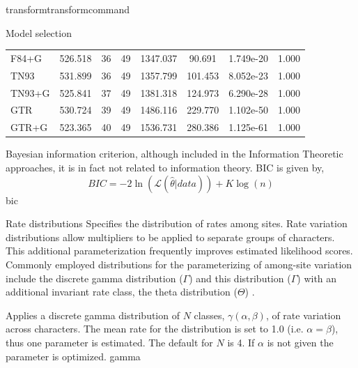 \begin{command}{transform}{transformcommand}
\begin{arguments}
\begin {argumentgroup}{Model selection}
\begin{table}[t]
\begin{center}
\begin{tabular}{ l c r r  r  c c  r }
                    F84+G &526.518&36&49&1347.037& 90.691&1.749e-20&1.000 \\
                    TN93  &531.899&36&49&1357.799&101.453&8.052e-23&1.000 \\
                    TN93+G&525.841&37&49&1381.318&124.973&6.290e-28&1.000 \\
                    GTR   &530.724&39&49&1486.116&229.770&1.102e-50&1.000 \\
                    GTR+G &523.365&40&49&1536.731&280.386&1.125e-61&1.000 \\
                       \hline
                    \end{tabular}
                \end{center}
\end{table}

                        { Bayesian information criterion, although included in
                        the Information Theoretic approaches, it is in fact not
                        related to information theory. BIC is given by,
                        \begin{equation*}
                            BIC = - 2 \ln(\mathcal{L}(\hat{\theta}|data)) + K \log(n)
                        \end{equation*}}
                        {bic}
                \end{argumentgroup}


\begin{argumentgroup}{Rate distributions}
                Specifies the distribution of rates among sites. Rate
                variation distributions allow multipliers to be applied to
                separate groups of characters. This additional parameterization
                frequently improves estimated likelihood scores.
                Commonly employed distributions for the parameterizing of 
                among-site variation include the discrete gamma distribution ($\Gamma$)
                \cite{yang1994a} and this distribution ($\Gamma$) with an additional
                invariant rate class, the theta distribution ($\Theta$)
                \cite{gu1995}. 
                

                        {Applies a discrete gamma distribution of $N$ classes,
                        $\gamma(\alpha,\beta)$, of rate variation across
                        characters. The mean rate for the distribution is set to
                        1.0 (i.e. $\alpha = \beta$), thus one parameter is
                        estimated. The default for $N$ is 4. If $\alpha$ is
                        not given the parameter is optimized.}
                        {gamma}


\end{argumentgroup}
\end{arguments}
\end{command}
